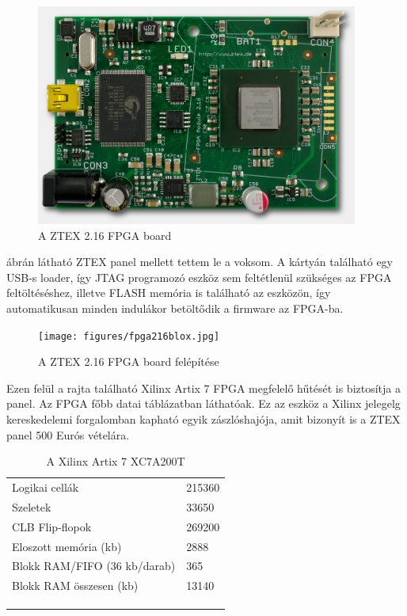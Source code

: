 \begin{figure}[!ht]
	\centering
	\includegraphics[width = \textwidth]{figures/fpga216.jpg}
	\caption{A ZTEX 2.16 FPGA board} 
	\label{fig:ztex}
\end{figure}

 ábrán látható ZTEX panel mellett tettem le a voksom. A kártyán található egy USB-s loader, így JTAG programozó eszköz sem feltétlenül szükséges az FPGA feltöltéséshez, illetve FLASH memória is található az eszközön, így automatikusan minden indulákor betöltődik a firmware az FPGA-ba.


\begin{figure}[!ht]
	\centering
	\texttt{[image: figures/fpga216blox.jpg]}
	\caption{A ZTEX 2.16 FPGA board felépítése} 
	\label{fig:ztex_block}
\end{figure}


Ezen felül a rajta található Xilinx Artix 7 FPGA megfelelő hűtését is biztosítja a panel. Az FPGA főbb datai  táblázatban láthatóak. Ez az eszköz a Xilinx jelegelg kereskedelemi forgalomban kapható egyik zászlóshajója, amit bizonyít is a ZTEX panel 500 Eurós vételára.

\begin{table}[]
\centering
\begin{tabular}{ll}
Logikai cellák               & 215360 \\
Szeletek                     & 33650  \\
CLB Flip-flopok              & 269200 \\
Eloszott memória (kb)        & 2888   \\
Blokk RAM/FIFO (36 kb/darab) & 365    \\
Blokk RAM összesen (kb)      & 13140  \\
                             &        \\
                             &        \\
                             & 
\caption{A Xilinx Artix 7 XC7A200T}
\label{artix7spec}      
\end{tabular}
\end{table}



